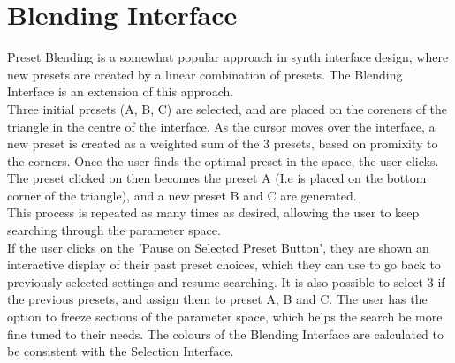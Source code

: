 \documentclass[11pt, oneside]{report}   	%
\begin{document}
\section{Blending Interface}
Preset Blending is a somewhat popular approach in synth interface design, where new presets are created by a linear combination of presets. The Blending Interface is an extension of this approach.\\
Three initial presets (A, B, C) are selected, and are placed on the coreners of the triangle in the centre of the interface. As the cursor moves over the interface, a new preset is created as a weighted sum of the 3 presets, based on promixity to the corners. Once the user finds the optimal preset in the space, the user clicks. The preset clicked on then becomes the preset A (I.e is placed on the bottom corner of the triangle), and a new preset B and C are generated. \\
This process is repeated as many times as desired, allowing the user to keep searching through the parameter space.\\
If the user clicks on the 'Pause on Selected Preset Button', they are shown an interactive display of their past preset choices, which they can use to go back to previously selected settings and resume searching. It is also possible to select 3 if the previous presets, and assign them to preset A, B and C.
The user has the option to freeze sections of the parameter space, which helps the search be more fine tuned to their needs.
The colours of the Blending Interface are calculated to be consistent with the Selection Interface.
\end{document}
